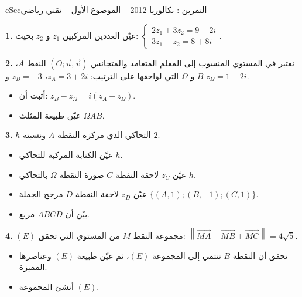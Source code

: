 \documentclass[12pt,a4paper]{article}
\newenvironment{BOX}[2]{\begin{otherlanguage}{english}\begin{arbox}{#1}{#2}}{\end{arbox}\end{otherlanguage}}
\newcounter{exo}
\newenvironment{tamrin}[1]{\stepcounter{exo}\begin{BOX}{cSec}{التمرين \theexo: #1}}{\end{BOX}}
\newenvironment{sq}{\begin{itemize}[leftmargin=2.4em,itemsep=3pt]}{\end{itemize}}
\newcommand{\qa}{\item[(أ)]}\newcommand{\qb}{\item[(ب)]}\newcommand{\qc}{\item[(جـ)]}\newcommand{\qd}{\item[(د)]}\newcommand{\qe}{\item[(هـ)]}
\newcommand{\QQ}[1]{\par\smallskip\textbf{#1.} }
\begin{document}
\begin{tamrin}{بكالوريا 2012 -- الموضوع الأول -- تقني رياضي}
\QQ{1} عيّن العددين المركبين $z_1$ و $z_2$ بحيث: $\begin{cases}2z_1+3z_2=9-2i\\ 3z_1-z_2=8+8i\end{cases}$.
\QQ{2} نعتبر في المستوي المنسوب إلى المعلم المتعامد والمتجانس $(O;\vec u,\vec v)$ النقط $A$، $B$ و $\Omega$ التي لواحقها على الترتيب:
$z_A=3+2i$، $z_B=-3$ و $z_\Omega=1-2i$.
\begin{sq}
\qa أثبت أن: $z_B-z_\Omega=i(z_A-z_\Omega)$.
\qb عيّن طبيعة المثلث $\Omega AB$.
\end{sq}
\QQ{3} $h$ التحاكي الذي مركزه النقطة $A$ ونسبته $2$.
\begin{sq}
\qa عيّن الكتابة المركبة للتحاكي $h$.
\qb عيّن $z_C$ لاحقة النقطة $C$ صورة النقطة $\Omega$ بالتحاكي $h$.
\qc عيّن $z_D$ لاحقة النقطة $D$ مرجح الجملة $\{(A,1);(B,-1);(C,1)\}$.
\qd بيّن أن $ABCD$ مربع.
\end{sq}
\QQ{4} $(E)$ مجموعة النقط $M$ من المستوي التي تحقق: $\left\|\overrightarrow{MA}-\overrightarrow{MB}+\overrightarrow{MC}\right\|=4\sqrt5$.
\begin{sq}
\qa تحقق أن النقطة $B$ تنتمي إلى المجموعة $(E)$، ثم عيّن طبيعة $(E)$ وعناصرها المميزة.
\qb أنشئ المجموعة $(E)$.
\end{sq}
\end{tamrin}
\end{document}
